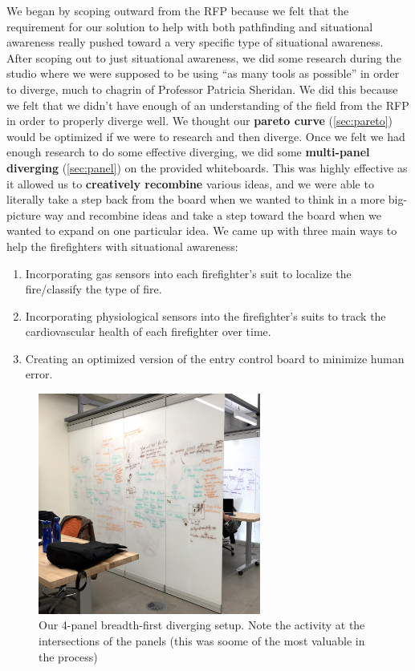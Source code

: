 \documentclass[a4paper,12pt]{article}
\begin{document}
We began by scoping outward from the RFP because we felt that the requirement for our solution to help with both pathfinding and situational awareness really pushed toward a very specific type of situational awareness. After scoping out to just situational awareness, we did some research during the studio where we were supposed to be using “as many tools as possible” in order to diverge, much to chagrin of Professor Patricia Sheridan. We did this because we felt that we didn’t have enough of an understanding of the field from the RFP in order to properly diverge well. We thought our \textbf{pareto curve} (\ref{sec:pareto}) would be optimized if we were to research and then diverge. Once we felt we had enough research to do some effective diverging, we did some \textbf{multi-panel diverging} (\ref{sec:panel}) on the provided whiteboards. This was highly effective as it allowed us to \textbf{creatively recombine} various ideas, and we were able to literally take a step back from the board when we wanted to think in a more big-picture way and recombine ideas and take a step toward the board when we wanted to expand on one particular idea. We came up with three main ways to help the firefighters with situational awareness:

\begin{enumerate}
	\item Incorporating gas sensors into each firefighter’s suit to localize the fire/classify the type of fire.
	\item Incorporating physiological sensors into the firefighter’s suits to track the cardiovascular health of each firefighter over time. 
	\item Creating an optimized version of the entry control board to minimize human error.
\end{enumerate}

\begin{figure}[H]
\centering
\includegraphics[width=0.65\textwidth]{img/image014.png}
\caption{Our 4-panel breadth-first diverging setup. Note the activity at the intersections of the panels (this was soome of the most valuable in the process)}
\label{}
\end{figure}
\end{document}
